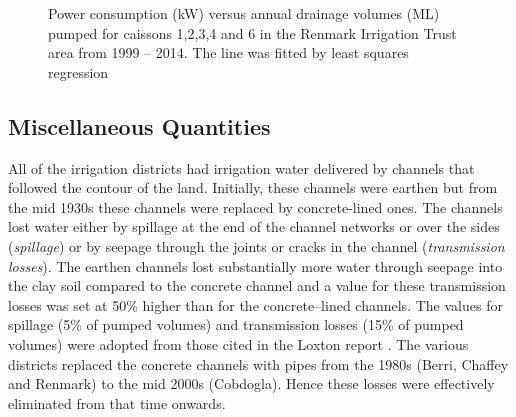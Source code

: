 \documentclass[a4paper, titlepage, 12pt]{article}\usepackage[]{graphicx}\usepackage[]{color}
\makeatletter
\newenvironment{kframe}{%
 \def\at@end@of@kframe{}%
 \ifinner\ifhmode%
  \def\at@end@of@kframe{\end{minipage}}%
  \begin{minipage}{\columnwidth}%
 \fi\fi%
 \def\FrameCommand##1{\hskip\@totalleftmargin \hskip-\fboxsep
 \colorbox{shadecolor}{##1}\hskip-\fboxsep
     \hskip-\linewidth \hskip-\@totalleftmargin \hskip\columnwidth}%
 \MakeFramed {\advance\hsize-\width
   \@totalleftmargin\z@ \linewidth\hsize
   \@setminipage}}%
 {\par\unskip\endMakeFramed%
 \at@end@of@kframe}
\newenvironment{knitrout}{}{} %
\makeatother
\begin{document}
\begin{sffamily}
\begin{figure}
\begin{knitrout}
\color{fgcolor}\begin{kframe}


{\ttfamily\noindent\bfseries\color{errorcolor}{\#\# Error in unique(as.integer(df3[df3\$caisson != "{}5"{}, ]\$caisson)): error in evaluating the argument 'x' in selecting a method for function 'unique': Error: object 'df3' not found}}

{\ttfamily\noindent\bfseries{}}\end{kframe}
\end{knitrout}
\caption{Power consumption (kW) versus annual drainage volumes (ML) pumped for caissons 1,2,3,4 and 6 in the Renmark Irrigation Trust area from 1999 -- 2014. The line was fitted by least squares regression}
\label{fig02}
\end{figure}

\subsection{Miscellaneous Quantities}
All of the irrigation districts had irrigation water delivered by channels that followed the contour of the land. Initially, these channels were earthen but from the mid 1930s these channels were replaced by concrete-lined ones. The channels lost water either by spillage at the end of the channel networks or over the sides (\textit{spillage}) or by seepage through the joints or cracks in the channel (\textit{transmission losses}). The earthen channels lost substantially more water through seepage into the clay soil compared to the concrete channel and a value for these transmission losses was set at 50\% higher than for the concrete--lined channels. The values for spillage (5\% of pumped volumes) and transmission losses (15\% of pumped volumes) were adopted from those cited in the Loxton report \citep{Meissner2011a}.  The various districts replaced the concrete channels with pipes from the 1980s (Berri, Chaffey and Renmark) to the mid 2000s (Cobdogla). Hence these losses were effectively eliminated from that time onwards.


\end{sffamily}
\end{document}
